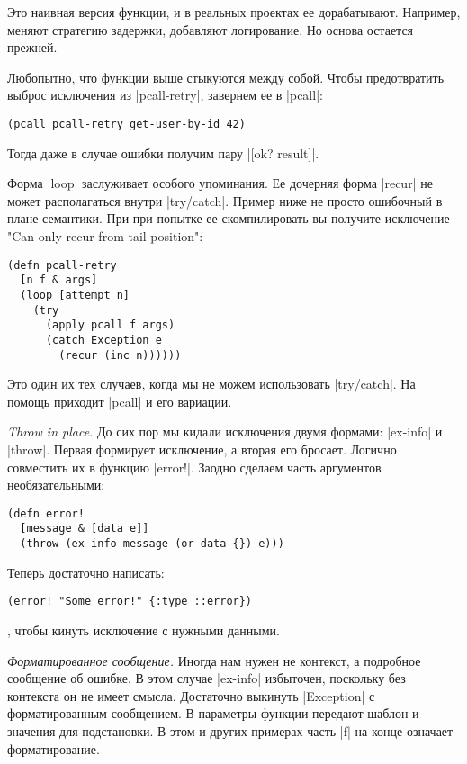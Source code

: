 Это наивная версия функции, и в реальных проектах ее дорабатывают. Например,
меняют стратегию задержки, добавляют логирование. Но основа остается прежней.

Любопытно, что функции выше стыкуются между собой. Чтобы предотвратить выброс
исключения из \spverb|pcall-retry|, завернем ее в \spverb|pcall|:

\begin{verbatim}
(pcall pcall-retry get-user-by-id 42)
\end{verbatim}

Тогда даже в случае ошибки получим пару \spverb|[ok? result]|.

Форма \spverb|loop| заслуживает особого упоминания. Ее дочерняя форма \spverb|recur| не может
располагаться внутри \spverb|try/catch|. Пример ниже не просто ошибочный в плане
семантики. При при попытке ее скомпилировать вы получите исключение "Can only
recur from tail position":

\begin{verbatim}
(defn pcall-retry
  [n f & args]
  (loop [attempt n]
    (try
      (apply pcall f args)
      (catch Exception e
        (recur (inc n))))))
\end{verbatim}

Это один их тех случаев, когда мы не можем использовать \spverb|try/catch|. На помощь
приходит \spverb|pcall| и его вариации.

\emph{Throw in place.} До сих пор мы кидали исключения двумя формами: \spverb|ex-info| и
\spverb|throw|. Первая формирует исключение, а вторая его бросает. Логично совместить
их в функцию \spverb|error!|. Заодно сделаем часть аргументов необязательными:

\begin{verbatim}
(defn error!
  [message & [data e]]
  (throw (ex-info message (or data {}) e)))
\end{verbatim}

Теперь достаточно написать:

\begin{verbatim}
(error! "Some error!" {:type ::error})
\end{verbatim}

, чтобы кинуть исключение с нужными данными.

\emph{Форматированное сообщение.} Иногда нам нужен не контекст, а подробное
сообщение об ошибке. В этом случае \spverb|ex-info| избыточен, поскольку без контекста
он не имеет смысла. Достаточно выкинуть \spverb|Exception| с форматированным
сообщением. В параметры функции передают шаблон и значения для подстановки. В
этом и других примерах часть \spverb|f| на конце означает форматирование.

